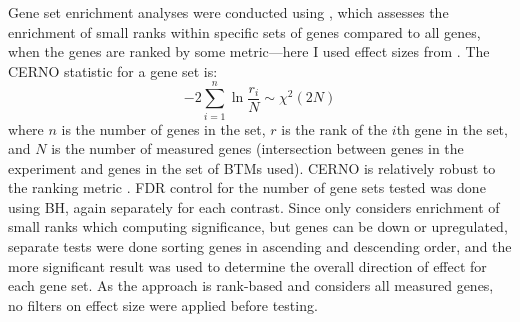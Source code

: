 Gene set enrichment analyses were conducted using  \autocite{weiner3rd2016TmodPackageGeneral}, 
which assesses the enrichment of small ranks within specific sets of genes compared to all genes, when the genes are ranked by some metric---here I used effect sizes from .
%
%
The CERNO statistic for a gene set is:
\begin{equation}
    -2 \sum_{i=1}^{n} \ln \frac{r_i}{N} \sim \chi^2(2N)
\end{equation}
where $n$ is the number of genes in the set,
$r$ is the rank of the $i$th gene in the set,
and $N$ is the number of measured genes (intersection between genes in the experiment and genes in the set of \glspl{BTM} used).
CERNO is relatively robust to the ranking metric \autocite{zyla2019GeneSetEnrichment}.
\gls{FDR} control for the number of gene sets tested was done using \gls{BH}, again separately for each contrast.
Since  only considers enrichment of small ranks which computing significance, 
but genes can be down or upregulated, 
separate tests were done sorting genes in ascending and descending order,
and the more significant result was used to determine the overall direction of effect for each gene set.
As the approach is rank-based and considers all measured genes, no filters on effect size were applied before testing.

